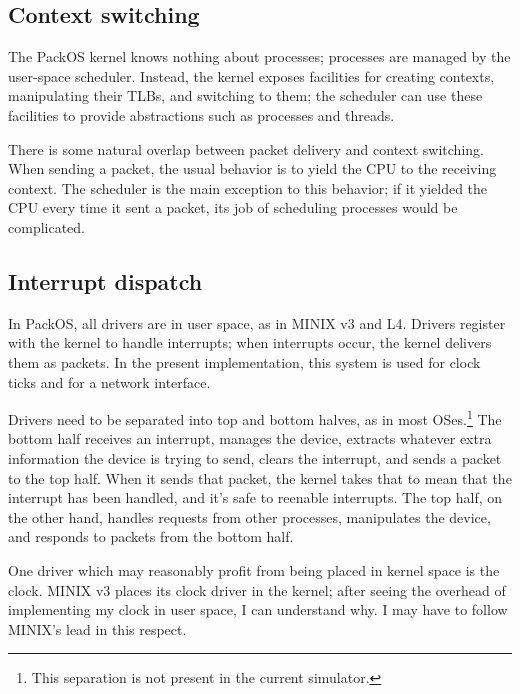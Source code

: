 \documentclass{article}
\begin{document}
\subsection{Context switching}

The PackOS kernel knows nothing about processes; processes are managed
by the user-space scheduler.  Instead, the kernel exposes facilities
for creating contexts, manipulating their TLBs, and switching to them;
the scheduler can use these facilities to provide abstractions such as
processes and threads.

There is some natural overlap between packet delivery and context
switching.  When sending a packet, the usual behavior is to yield the
CPU to the receiving context.  The scheduler is the main exception to
this behavior; if it yielded the CPU every time it sent a packet, its
job of scheduling processes would be complicated.

\subsection{Interrupt dispatch}

In PackOS, all drivers are in
user space, as in MINIX v3\cite{Tanenbaum:2006} and L4.  Drivers
register with the kernel to handle interrupts; when interrupts occur,
the kernel delivers them as packets.  In the present implementation,
this system is used for clock ticks and for a network interface.

Drivers need to be separated
into top and bottom halves, as in most OSes.\footnote{This separation
is not present in the current simulator.}
The bottom half
receives an interrupt, manages the device, extracts whatever extra
information the device is trying to send, clears the interrupt, and
sends a packet to the top half.  When it sends that packet, the kernel
takes that to mean that the interrupt has been handled, and it's
safe to reenable interrupts.  The top half, on the other hand,
handles requests from other processes, manipulates the device, and
responds to packets from the bottom half.

One driver which may reasonably profit from being placed in kernel
space is the clock.  MINIX v3 places its clock driver in the kernel;
after seeing the overhead of implementing my clock in user space, I
can understand why.  I may have to follow MINIX's lead in this
respect.
\end{document}
